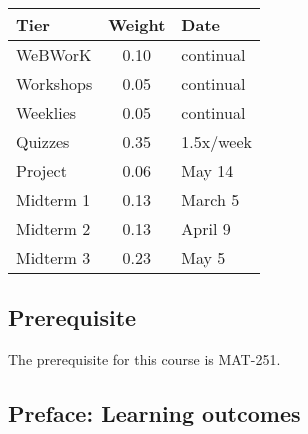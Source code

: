 \documentclass[symmetric]{tufte-handout}
\begin{document}
    \begin{minipage}[t]{0.44\linewidth}
        \vspace{0pt}
        \centering{}\vspace*{1.0ex}
        \begin{tabular}{lcl}
            \toprule
            Tier & Weight & Date \\
            \midrule
            WeBWorK       & 0.10 & continual \\
            Workshops     & 0.05 & continual \\
            Weeklies      & 0.05 & continual \\  
            Quizzes       & 0.35 & 1.5x/week \\
            Project       & 0.06 & May 14 \\
            Midterm 1     & 0.13 & March 5 \\
            Midterm 2     & 0.13 & April 9 \\
            Midterm 3     & 0.23 & May 5 \\
            \bottomrule
        \end{tabular}
    \end{minipage} \hspace*{1em}

\subsection{Prerequisite}

The prerequisite for this course is MAT-251.

\subsection{Preface: Learning outcomes} \label{ssec:prefacelearningoutcomes}
\end{document}
